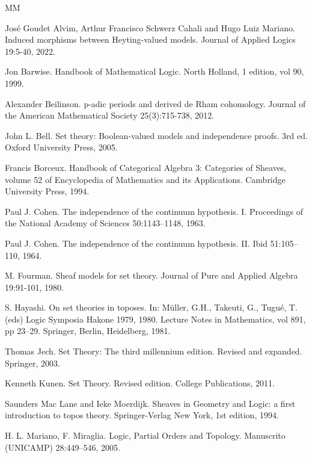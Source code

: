 \documentclass[10pt,longbibliography]{article}
\begin{document}
\begin{thebibliography}{MM}




  José Goudet Alvim, Arthur Francisco Schwerz Cahali and Hugo Luiz Mariano. Induced morphisms between Heyting-valued models. 
 Journal of Applied Logics 19:5-40, 2022.

  Jon Barwise. Handbook of Mathematical Logic. North Holland, 1 edition, vol 90, 1999.

 Alexander Beilinson. p-adic periods and derived de Rham cohomology. Journal of the American Mathematical Society 25(3):715-738, 2012.

  John L. Bell. Set theory: Boolean-valued models and independence proofs. 3rd ed. Oxford
University Press, 2005.

 Francis Borceux. Handbook of Categorical Algebra 3: Categories of Sheaves,
volume 52 of Encyclopedia of Mathematics and its Applications. Cambridge University Press, 1994.

   Paul J. Cohen. The independence of the continuum hypothesis. I. Proceedings of the National
Academy of Sciences 50:1143–1148, 1963.


   Paul J. Cohen. The independence of the continuum hypothesis. II. Ibid 51:105–110, 1964.


 M. Fourman. Sheaf models for set theory. Journal of Pure and Applied Algebra
 19:91-101, 1980.


 S. Hayashi. On set theories in toposes. In: Müller, G.H., Takeuti, G., Tugué, T. (eds) Logic Symposia Hakone 1979, 1980. Lecture Notes in Mathematics, vol 891, pp 23--29. Springer, Berlin, Heidelberg, 1981.

  Thomas Jech. Set Theory: The third millennium edition. Revised and expanded. Springer,
2003.

  Kenneth Kunen. Set Theory. Revised edition. College Publications, 2011.

  Saunders Mac Lane and Ieke Moerdijk. Sheaves in Geometry and Logic: a first introduction
to topos theory. Springer-Verlag New York, 1st edition, 1994.


 H. L. Mariano, F. Miraglia. Logic, Partial Orders and Topology. Manuscrito (UNICAMP) 28:449--546, 2005. 


\end{thebibliography}
\end{document}
